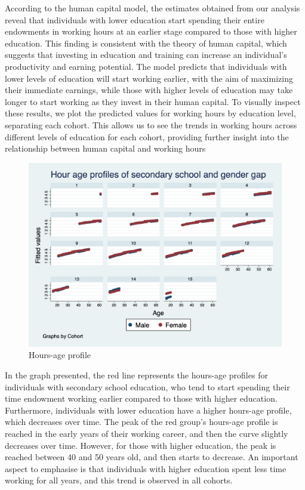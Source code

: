 \documentclass[14pt]{sistedes}
\begin{document}
According to the human capital model, the estimates obtained from our analysis reveal that individuals with lower education start spending their entire endowments in working hours at an earlier stage compared to those with higher education. This finding is consistent with the theory of human capital, which suggests that investing in education and training can increase an individual's productivity and earning potential. The model predicts that individuals with lower levels of education will start working earlier, with the aim of maximizing their immediate earnings, while those with higher levels of education may take longer to start working as they invest in their human capital.
\newline
To visually inspect these results, we plot the predicted values for working hours by education level, separating each cohort. This allows us to see the trends in working hours across different levels of education for each cohort, providing further insight into the relationship between human capital and working hours
\begin{figure}
    \centering
    \includegraphics[scale=0.3]{graph6.png}
    \caption{Hours-age profile}
    \label{fig:h_cohorts}
\end{figure}
In the graph presented, the red line represents the hours-age profiles for individuals with secondary school education, who tend to start spending their time endowment working earlier compared to those with higher education. Furthermore, individuals with lower education have a higher hours-age profile, which decreases over time. The peak of the red group's hours-age profile is reached in the early years of their working career, and then the curve slightly decreases over time. However, for those with higher education, the peak is reached between 40 and 50 years old, and then starts to decrease. An important aspect to emphasise is that individuals with higher education spent less time working for all years, and this trend is observed in all cohorts.
\end{document}
